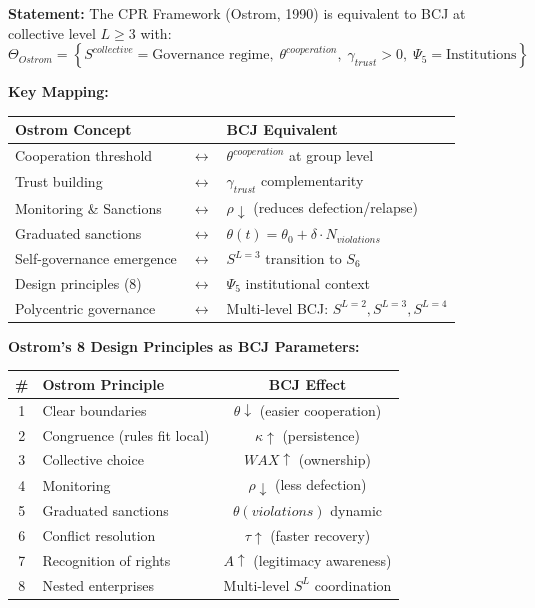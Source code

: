 \begin{tcolorbox}[colback=green!5!white, colframe=green!75!black,
    title=Theorem BCJ-T21: Ostrom Common Pool Resources as Special Case]
\textbf{Statement:} The CPR Framework (Ostrom, 1990) is equivalent to BCJ at collective level $L \geq 3$ with:
\begin{equation}
\Theta_{Ostrom} = \left\{S^{collective} = \text{Governance regime}, \; \theta^{cooperation}, \; \gamma_{trust} > 0, \; \Psi_5 = \text{Institutions}\right\}
\end{equation}

\textbf{Key Mapping:}
\begin{center}
\begin{tabular}{lcl}
\toprule
\textbf{Ostrom Concept} & & \textbf{BCJ Equivalent} \\
\midrule
Cooperation threshold & $\leftrightarrow$ & $\theta^{cooperation}$ at group level \\
Trust building & $\leftrightarrow$ & $\gamma_{trust}$ complementarity \\
Monitoring \& Sanctions & $\leftrightarrow$ & $\rho \downarrow$ (reduces defection/relapse) \\
Graduated sanctions & $\leftrightarrow$ & $\theta(t) = \theta_0 + \delta \cdot N_{violations}$ \\
Self-governance emergence & $\leftrightarrow$ & $S^{L=3}$ transition to $S_6$ \\
Design principles (8) & $\leftrightarrow$ & $\Psi_5$ institutional context \\
Polycentric governance & $\leftrightarrow$ & Multi-level BCJ: $S^{L=2}, S^{L=3}, S^{L=4}$ \\
\bottomrule
\end{tabular}
\end{center}

\textbf{Ostrom's 8 Design Principles as BCJ Parameters:}
\begin{center}
\small
\begin{tabular}{clc}
\toprule
\textbf{\#} & \textbf{Ostrom Principle} & \textbf{BCJ Effect} \\
\midrule
1 & Clear boundaries & $\theta \downarrow$ (easier cooperation) \\
2 & Congruence (rules fit local) & $\kappa \uparrow$ (persistence) \\
3 & Collective choice & $WAX \uparrow$ (ownership) \\
4 & Monitoring & $\rho \downarrow$ (less defection) \\
5 & Graduated sanctions & $\theta(violations)$ dynamic \\
6 & Conflict resolution & $\tau \uparrow$ (faster recovery) \\
7 & Recognition of rights & $A \uparrow$ (legitimacy awareness) \\
8 & Nested enterprises & Multi-level $S^L$ coordination \\
\bottomrule
\end{tabular}
\end{center}


\end{tcolorbox}

